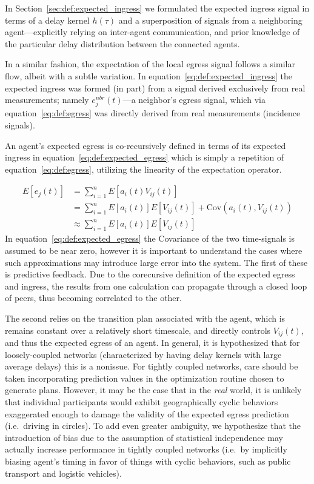 \documentclass{report}
\begin{document}
In Section~\ref{sec:def:expected_ingress} we formulated the expected ingress signal in terms of a delay kernel $h(\tau)$ and a superposition of signals from a neighboring agent---explicitly relying on inter-agent communication, and prior knowledge of the particular delay distribution between the connected agents.

In a similar fashion, the expectation of the local egress signal follows a similar flow, albeit with a subtle variation.
In equation~\eqref{eq:def:expected_ingress} the expected ingress was formed (in part) from a signal derived exclusively from real measurements; namely $e^{nbr}_j(t)$---a neighbor's egress signal, which via equation~\eqref{eq:def:egress} was directly derived from real measurements (incidence signals).

An agent's expected egress is co-recursively defined in terms of its expected ingress in equation~\eqref{eq:def:expected_egress} which is simply a repetition of equation~\eqref{eq:def:egress}, utilizing the linearity of the expectation operator.


\begin{align}\label{eq:def:expected_egress}
	E\left[e_j(t)\right] &= \sum_{i=1}^n E\left[a_i(t) V_{ij}(t)\right]\\
							&= \sum_{i=1}^n E\left[a_i(t)\right] E\left[V_{ij}(t)\right] + \mbox{Cov}(a_i(t), V_{ij}(t))\\
							&\approx \sum_{i=1}^n  E\left[a_i(t)\right] E\left[V_{ij}(t)\right]
\end{align}
In equation~\eqref{eq:def:expected_egress} the Covariance of the two time-signals is assumed to be near zero, however it is important to understand the cases where such approximations may introduce large error into the system.
The first of these is predictive feedback.
Due to the corecursive definition of the expected egress and ingress, the results from one calculation can propagate through a closed loop of peers, thus becoming correlated to the other.

The second relies on the transition plan associated with the agent, which is remains constant over a relatively short timescale, and directly controls $V_{ij}(t)$, and thus the expected egress of an agent.
In general, it is hypothesized that for loosely-coupled networks (characterized by having delay kernels with large average delays) this is a nonissue.
For tightly coupled networks, care should be taken incorporating prediction values in the optimization routine chosen to generate plans.
However, it may be the case that in the \emph{real} world, it is unlikely that individual participants would exhibit geographically cyclic behaviors exaggerated enough to damage the validity of the expected egress prediction (i.e.\ driving in circles).
To add even greater ambiguity, we hypothesize that the introduction of bias due to the assumption of statistical independence may actually increase performance in tightly coupled networks (i.e.\ by implicitly biasing agent's timing in favor of things with cyclic behaviors, such as public transport and logistic vehicles).
\end{document}

